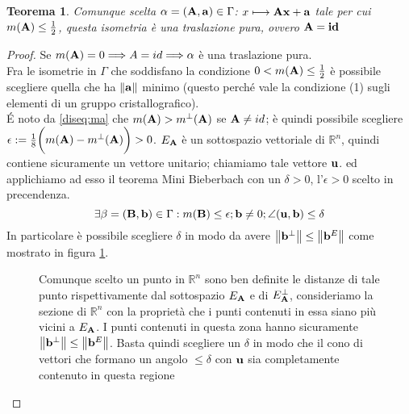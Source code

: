 \documentclass[a4paper]{book}
\newtheorem{theorem}{Teorema}[section]
\begin{document}
\begin{theorem}
 Comunque scelta $\alpha = (\vb{A, a}) \in \Gamma$:  $x \longmapsto \vb{Ax +a} $  tale per cui $m(\vb{A}) \leq \frac{1}{2} $, questa isometria è una traslazione pura, ovvero $\vb{A} = \vb{id}$
\end{theorem}

\begin{proof}
Se $m(\vb{A}) = 0 \Longrightarrow A = id \Longrightarrow \alpha$ è una traslazione pura. \\
Fra le isometrie in $\Gamma$ che soddisfano la condizione  $ 0 < m(\vb{A}) \leq \frac{1}{2}$ è possibile scegliere quella che ha $\norm{\vb{a}}$ minimo (questo perché vale la condizione (1) sugli elementi di un gruppo cristallografico). \\
\'E noto da \ref{diseq:ma} che $m(\vb{A}) > m^{\perp}(\vb{A})$ se  $\vb{A} \neq id$; è quindi possibile scegliere  $\epsilon := \frac{1}{8} \bigg( m(\vb{A}) - m^{\perp}(\vb{A}) \bigg) >0$.
$E_{\vb{A}}$ è un sottospazio vettoriale di $\mathbb{R}^n$, quindi contiene sicuramente un vettore unitario; chiamiamo tale vettore $\vb{u}$.  ed applichiamo ad esso il teorema Mini Bieberbach con un $\delta >0$, l'$\epsilon >0 $ scelto in precendenza. \\
\[ \exists \beta = (\vb{B, b}) \in \Gamma : m(\vb{B}) \leq \epsilon ; \vb{b} \neq 0 ; \angle(\vb{u, b})  \leq \delta \]
In particolare è possibile scegliere $\delta $ in modo da avere $\norm{\vb{b}^{\perp}} \leq \norm{\vb{b}^E}$ come mostrato in figura \ref{fig:ea}. \\
\begin{figure}[h!]
\centering
{}
\caption{Comunque scelto un punto in $\mathbb{R}^n$ sono ben definite le distanze di tale punto rispettivamente dal sottospazio $E_{\vb{A}}$ e di $E_{\vb{A}}^{\perp}$, consideriamo la sezione di $\mathbb{R}^n$ con la proprietà che i punti contenuti in essa siano più vicini a $E_{\vb{A}}$. I punti contenuti in questa zona hanno sicuramente  $\norm{\vb{b}^{\perp}} \leq \norm{\vb{b}^E}$. Basta quindi scegliere un $\delta$ in modo che il cono di vettori che formano un angolo $\leq \delta$ con $\vb{u} $ sia completamente contenuto in questa regione}
\label{fig:ea}
\end{figure}


\end{proof}
\end{document}
